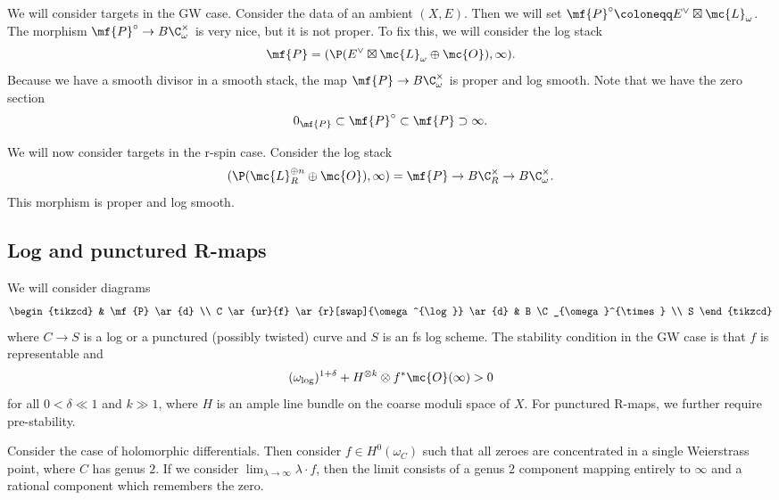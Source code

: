 We will consider targets in the GW case.
Consider the data of an ambient \((X, E)\). Then we will set \(\mf{P}^{\circ} \coloneqq E^{\vee} \boxtimes \mc{L}_{\omega}\). The morphism \(\mf{P}^{\circ} \to B \C_{\omega}^{\times}\) is very nice, but it is not proper. To fix this, we will consider the log stack
\[ \mf{P} = ( \P(E^{\vee} \boxtimes \mc{L}_{\omega} \oplus \mc{O}) , \infty). \]
Because we have a smooth divisor in a smooth stack, the map \(\mf{P} \to B \C_{\omega}^{\times}\) is proper and log smooth. Note that we have the zero section
\[ 0_{\mf{P}} \subset \mf{P}^{\circ} \subset \mf{P} \supset \infty. \]

We will now consider targets in the r-spin case. Consider the log stack
\[ (\P(\mc{L}_R^{\oplus n} \oplus \mc{O}), \infty) = \mf{P} \to B \C_R^{\times} \to B \C_{\omega}^{\times}. \]
This morphism is proper and log smooth.

\subsection{Log and punctured R-maps}%
\label{sub:Log and punctured R-maps}

We will consider diagrams
\begin{equation*}
\begin{tikzcd}
    & \mf{P} \ar{d} \\
    C \ar{ur}{f} \ar{r}[swap]{\omega^{\log}} \ar{d} & B \C_{\omega}^{\times} \\
    S
\end{tikzcd}
\end{equation*}
where \(C \to S\) is a log or a punctured (possibly twisted) curve and \(S\) is an fs log scheme. The stability condition in the GW case is that \(f\) is representable and 
\[ (\omega_{\log})^{1+\delta} + H^{\otimes k} \otimes f^* \mc{O}(\infty) > 0 \]
for all \(0 < \delta \ll 1\) and \(k \gg 1\), where \(H\) is an ample line bundle on the coarse moduli space of \(X\). For punctured R-maps, we further require pre-stability.

\begin{exm}
    Consider the case of holomorphic differentials. Then consider \(f \in H^0(\omega_C)\) such that all zeroes are concentrated in a single Weierstrass point, where \(C\) has genus \(2\). If we consider \(\lim_{\lambda \to \infty} \lambda \cdot f\), then the limit consists of a genus \(2\) component mapping entirely to \(\infty\) and a rational component which remembers the zero.
\end{exm}

